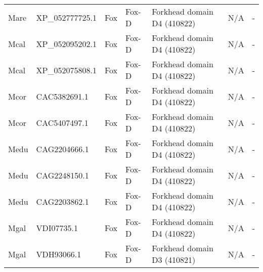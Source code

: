 \documentclass[../main.tex]{subfiles}
\begin{document}
\begin{landscape}
\begin{longtable}{lllllll}
		Mare           & XP\_052777725.1       & Fox            & Fox-D               & Forkhead domain D4 (410822)                 & N/A                                                                    & -                    \\
		Mcal           & XP\_052095202.1       & Fox            & Fox-D               & Forkhead domain D4 (410822)                 & N/A                                                                    & -                    \\
		Mcal           & XP\_052075808.1       & Fox            & Fox-D               & Forkhead domain D4 (410822)                 & N/A                                                                    & -                    \\
		Mcor           & CAC5382691.1          & Fox            & Fox-D               & Forkhead domain D4 (410822)                 & N/A                                                                    & -                    \\
		Mcor           & CAC5407497.1          & Fox            & Fox-D               & Forkhead domain D4 (410822)                 & N/A                                                                    & -                    \\
		Medu           & CAG2204666.1          & Fox            & Fox-D               & Forkhead domain D4 (410822)                 & N/A                                                                    & -                    \\
		Medu           & CAG2248150.1          & Fox            & Fox-D               & Forkhead domain D4 (410822)                 & N/A                                                                    & -                    \\
		Medu           & CAG2203862.1          & Fox            & Fox-D               & Forkhead domain D4 (410822)                 & N/A                                                                    & -                    \\
		Mgal           & VDI07735.1            & Fox            & Fox-D               & Forkhead domain D4 (410822)                 & N/A                                                                    & -                    \\
		Mgal           & VDH93066.1            & Fox            & Fox-D               & Forkhead domain D3 (410821)                 & N/A                                                                    & -                    \\

\end{longtable}
\end{landscape}
\end{document}
